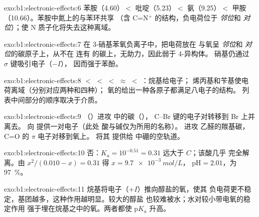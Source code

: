 \begin{solution}{exo:b1:electronic-effects:6}
苯胺（4.60）$<$ 吡啶（5.23）$<$ 氨（9.25）$<$ 甲胺
（10.66）。苯胺中氮上的与苯环共享
（含 C=N$^+$ 的结构，负电荷位于 \textit{邻位}和
\textit{对位}）；使 N 质子化将失去这种离域。
\end{solution}

\begin{solution}{exo:b1:electronic-effects:7}
在 3-硝基苯氧负离子中，把电荷放在
与氧呈 \textit{邻位}和 \textit{对位}的碳原子上，从不在
连有  的碳上，无助力，因此弱于 4-异构体。
硝基仍通过 $\sigma$ 键吸引电子（$-I$），
因而强于苯酚。
\end{solution}

\begin{solution}{exo:b1:electronic-effects:8}
 $<$  $<$  $<$ 
$\approx$  $<$ ：烷基给电子；
烯丙基和苄基使电荷离域（分别对应两种和四种）；
氧的给出一种各原子都满足八电子的结构。
列表中间部分的顺序取决于介质。
\end{solution}

\begin{solution}{exo:b1:electronic-effects:9}
（）进攻  中的碳（），
C--Br 键的电子对转移到 Br 上并离去。 向  提供一对电子（此处
酸与碱仅为所用的名称）。 进攻
乙醛的羰基碳，C=O 的 $\pi$ 电子对移到氧上。 将其
提供给  中硼的空轨道。
\end{solution}

\begin{solution}{exo:b1:electronic-effects:10}
否：$K_a = 10^{-0.51} = 0.31$ 远大于 $C$；该酸几乎
完全解离。由 $x^2/(0.010 - x) = 0.31$ 得 $x = \qty{9.7e-3}{mol/L}$，
$\mathrm{pH} = 2.01$，为 \qty{97}{\percent}。
\end{solution}

\begin{solution}{exo:b1:electronic-effects:11}
烷基将电子（$+I$）推向醇盐的氧，使其
负电荷更不稳定，基团越多，这种作用越明显。较大的醇盐
也较难被水；水对较小带电氧的稳定作用
强于埋在烷基之中的氧。两者都使
$\mathrm{p}K_a$ 升高。
\end{solution}

